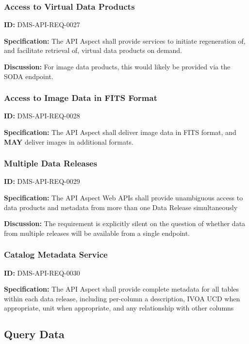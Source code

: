 \documentclass[SE,toc,lsstdraft]{lsstdoc}
\begin{document}
\subsubsection{Access to Virtual Data Products}

\label{DMS-API-REQ-0027}
\textbf{ID:} DMS-API-REQ-0027

\textbf{Specification:}
The API Aspect shall provide services to initiate regeneration of, and facilitate retrieval of, virtual data products on demand.

\textbf{Discussion:}
For image data products, this would likely be provided via the SODA endpoint.

\subsubsection{Access to Image Data in FITS Format}

\label{DMS-API-REQ-0028}
\textbf{ID:} DMS-API-REQ-0028

\textbf{Specification:}
The API Aspect shall deliver image data in FITS format, and \textbf{MAY} deliver images in additional formats.

\subsubsection{Multiple Data Releases}

\label{DMS-API-REQ-0029}
\textbf{ID:} DMS-API-REQ-0029

\textbf{Specification:}
The API Aspect Web APIs shall provide unambiguous access to data products and metadata from more than one Data Release simultaneously

\textbf{Discussion:}
The requirement is explicitly silent on the question of whether data from multiple releases will be available from a single endpoint.

\subsubsection{Catalog Metadata Service}

\label{DMS-API-REQ-0030}
\textbf{ID:} DMS-API-REQ-0030

\textbf{Specification:}
The API Aspect shall provide complete metadata for all tables within each data release, including per-column a description, IVOA UCD when appropriate, unit when appropriate, and any relationship with other columns

\subsection{Query Data}
\end{document}
